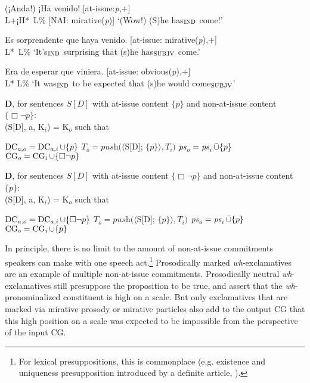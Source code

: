 \begin{exe} 
\ex \label{ex:mesorprendequehayavenido}
	\begin{xlist}
		
		\ex (¡Anda!) ¡Ha venido! \hfill [at-issue:\textit{p},$+$]\\
		\hspace*{5.5em} L+¡H*~L\% \hfill [\ac{NAI}: mirative(\textit{p})]
		\glt `(Wow!) (S)he has$_{\textsc{IND}}$ come!'
		
		\ex	Es sorprendente que haya venido. \hfill [at-issue: mirative(\textit{p}),$+$]\\
		\hspace*{11.5em} L*~L\% 
		\glt `It's$_{\textsc{IND}}$ surprising that (s)he has$_{\textsc{SUBJV}}$ come.'
		
		\ex Era de esperar que viniera. \hfill [at-issue: obvious(\textit{p}),$+$]\\
		\hspace*{9em} L* L\% 
		\glt `It was$_{\textsc{IND}}$ to be expected that (s)he would come$_{\textsc{SUBJV}}$'
	\end{xlist}

\ex\label{ex:declarativeoperatorrevised2indicativeMIR2} 
	\textbf{D}, for sentences $S[D]$ with at-issue content $\{ p \}$ and non-at-issue content $\{ \Box\neg p\}$:\\
			(S[D], a, K$_{i}$) = K$_{o}$ such that 
	\begin{xlist}
		\ex $\operatorname{DC}_{a,o} = \operatorname{DC}_{a,i}\cup \{ p \}$ 
		\ex $T_{o} = \textit{push}(\langle$S[D]; $\{ p \}\rangle, T_{i})$
		\ex $\operatorname{\text{\textit{ps}}}_{o} = \operatorname{\text{\textit{ps}}}_{i}\bar{\cup}\{ p \}$
		\ex $\operatorname{CG}_{o} = \operatorname{CG}_{i} \cup \{ \Box\neg p\}$
	\end{xlist}

\ex\label{ex:declarativeoperatorrevised2subjunctiveMIR2} \textbf{D}, for sentences $S[D]$ with at-issue content $\{ \Box\neg p\}$ and non-at-issue content $\{ p \}$: \\
	(S[D], a, K$_{i}$) = K$_{o}$ such that \\
	\begin{xlist}
		\ex $\operatorname{DC}_{a,o} = \operatorname{DC}_{a,i}\cup \{ \Box\neg p\}$
		\ex $T_{o} = \textit{push}(\langle$S[D]; $\{ p \}\rangle, T_{i})$
		\ex $\operatorname{\text{\textit{ps}}}_{o} = \operatorname{\text{\textit{ps}}}_{i}\bar{\cup}\{ p \}$
		\ex $\operatorname{CG}_{o} = \operatorname{CG}_{i} \cup\{ p \}$
	\end{xlist}
\end{exe}

In principle, there is no limit to the amount of non-at-issue commitments speakers can make with one speech act.\footnote{For lexical presuppositions, this is commonplace (e.g. existence and uniqueness presupposition introduced by a definite article, \cite[205--211]{ZimmermannSternefeld.2013}).} Prosodically marked \textit{wh}-exclamatives are an example of multiple non-at-issue commitments. Prosodically neutral \textit{wh}-exclamatives still presuppose the proposition to be true, and assert that the \textit{wh}-pronominalized constituent is high on a scale. But only exclamatives that are marked via mirative prosody or mirative particles also add to the output \ac{CG} that this high position on a scale was expected to be impossible from the perspective of the input \ac{CG}.


